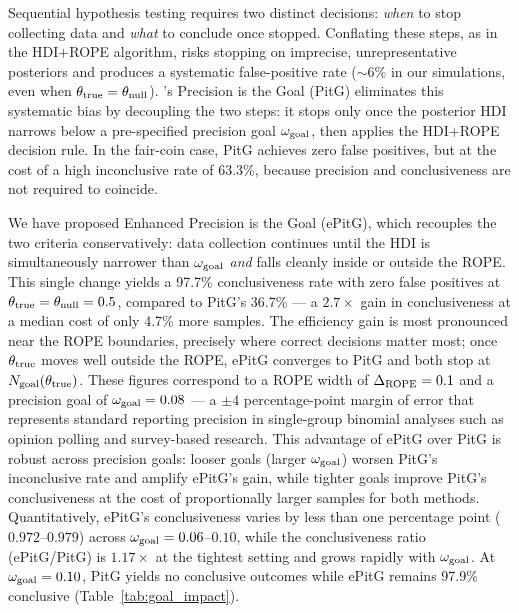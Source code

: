 
Sequential hypothesis testing requires two distinct decisions: \textit{when} to stop
collecting data and \textit{what} to conclude once stopped. Conflating these steps,
as in the HDI+ROPE algorithm, risks stopping on imprecise, unrepresentative posteriors
and produces a systematic false-positive rate ($\sim\!6\%$ in our simulations, even
when $\theta_{\rm true}=\theta_{\rm null}$).
\citet{kruschke2015doing}'s Precision is the Goal (PitG) eliminates this systematic
bias by decoupling the two steps: it stops only once the posterior HDI narrows below a
pre-specified precision goal $\omega_{\rm goal}$, then applies the HDI+ROPE decision
rule. In the fair-coin case, PitG achieves zero false positives, but at the cost of a
high inconclusive rate of 63.3\%, because precision and conclusiveness
are not required to coincide.

We have proposed Enhanced Precision is the Goal (ePitG), which recouples the two
criteria conservatively: data collection continues until the HDI is simultaneously
narrower than $\omega_{\rm goal}$ \textit{and} falls cleanly inside or outside the
ROPE\@. This single change yields a 97.7\% conclusiveness rate with zero false
positives at $\theta_{\rm true}=\theta_{\rm null}=0.5$, compared to
PitG's 36.7\% --- a $2.7\times$ gain in conclusiveness at a median cost of only 4.7\%
more samples. The efficiency gain is most pronounced near the ROPE boundaries, precisely
where correct decisions matter most; once $\theta_{\rm true}$ moves well outside the
ROPE, ePitG converges to PitG and both stop at $N_{\rm goal}(\theta_{\rm true})$.
These figures correspond to a ROPE width of $\Delta_{\rm ROPE}=0.1$ and a precision
goal of $\omega_{\rm goal}=0.08$ --- a $\pm 4$ percentage-point margin of error that
represents standard reporting precision in single-group binomial analyses
such as opinion polling and survey-based research.
This advantage of ePitG over PitG is robust across precision goals: looser goals (larger $\omega_{\rm goal}$) worsen PitG's
inconclusive rate and amplify ePitG's gain, while tighter goals improve PitG's
conclusiveness at the cost of proportionally larger samples for both methods.
Quantitatively, ePitG's conclusiveness varies by less than one percentage point
($0.972$--$0.979$) across $\omega_{\rm goal}=0.06$--$0.10$, while the
conclusiveness ratio (ePitG/PitG) is $1.17\times$ at the tightest
setting and grows rapidly with $\omega_{\rm goal}$.
At $\omega_{\rm goal}=0.10$, PitG yields no conclusive outcomes while ePitG
remains 97.9\% conclusive (Table~\ref{tab:goal_impact}).

